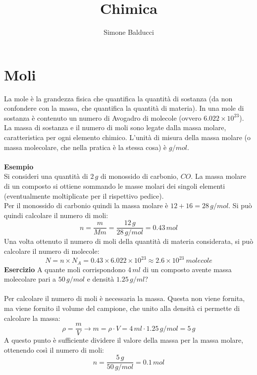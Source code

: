 \documentclass[12pt]{article}
\title{Chimica}
\author{Simone Balducci}
\date{}
\begin{document}
\maketitle

\section{Moli}
La mole è la grandezza fisica che quantifica la quantità di sostanza (da non confondere con la massa, che quantifica la quantità di materia). In una mole di sostanza è contenuto un numero di 
Avogadro di molecole (ovvero $6.022 \times 10^{23}$). \\
La massa di sostanza e il numero di moli sono legate dalla massa molare, caratteristica per ogni elemento chimico. L'unità di misura della massa molare (o massa molecolare, che nella pratica è 
la stessa cosa) è $g/mol$. \\ \\
\textbf{Esempio} \\
Si consideri una quantità di $2\,g$ di monossido di carbonio, $CO$. La massa molare di un composto si ottiene sommando le masse molari dei singoli elementi (eventualmente moltiplicate per il 
rispettivo pedice). \\
Per il monossido di carbonio quindi la massa molare è $12 + 16 = 28\,g/mol$. Si può quindi calcolare il numero di moli:
$$
    n = \frac{m}{Mm} = \frac{12\,g}{28\,g/mol} = 0.43\,mol 
$$
Una volta ottenuto il numero di moli della quantità di materia considerata, si può calcolare il numero di molecole:
$$
    N = n \times N_A = 0.43 \times 6.022 \times 10^{23} \approx 2.6\times 10^{23} \ molecole
$$
\textbf{Esercizio}
A quante moli corrispondono $4\,ml$ di un composto avente massa molecolare pari a $50\,g/mol$ e densità $1.25\,g/ml$? \\ \\ 
Per calcolare il numero di moli è necessaria la massa. Questa non viene fornita, ma viene fornito il volume del campione, che unito alla densità ci permette di calcolare la massa:
$$
    \rho = \frac{m}{V} \rightarrow m = \rho\cdot V = 4\,ml \cdot 1.25\,g/mol = 5\,g
$$
A questo punto è sufficiente dividere il valore della massa per la massa molare, ottenendo così il numero di moli:
$$
    n = \frac{5\,g}{50\,g/mol} = 0.1\,mol
$$
\end{document}
